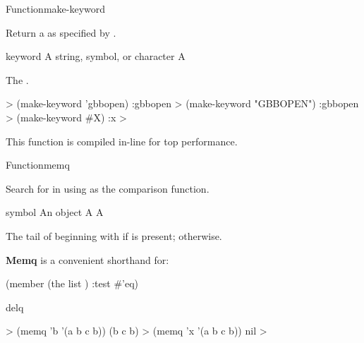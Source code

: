 \documentclass[10pt,twoside,english,pdftex]{article}
\newcommand{\inline}{This function is compiled in-line for top performance.}
\begin{document}

\begin{functiondoc}{Function}{make-keyword}{
    \returns{} } 
%
%
  
\fnsyntax

\fnpurpose Return a  as specified by .

\fnpackage {}

\fnmodule {}

\fnargs
\begin{args}{keyword}
\arg[x] A string, symbol, or character
\arg[keyword] A 
\end{args}

\fnreturns The .

\fnexamples
%
\W\supp
\begin{example}
  > (make-keyword 'gbbopen)
  :gbbopen
  > (make-keyword "GBBOPEN")
  :gbbopen
  > (make-keyword #\bkslash{}X)
  :x
  >
\end{example}

\fnnote \inline

\end{functiondoc}


\begin{functiondoc}{Function}{memq}{
    \returns{} } 
%
  
\fnsyntax

\fnpurpose Search for  in  using  as the
comparison function.

\fnpackage {}

\fnmodule {}

\fnargs
\begin{args}{symbol}
\arg[item] An object
\arg[list] A 
\arg[tail] A 
\end{args}

\fnreturns The tail of  beginning with  if
 is present; \nil{} otherwise.

\fndescription \textbf{Memq} is a convenient shorthand for:
%
\W\supp
\begin{example}
  (member  (the list ) :test #'eq)
\end{example}

\begin{alsos}{delq}
\also[delq]
\end{alsos}

\fnexamples
%
\W\supp
\begin{example}
  > (memq 'b '(a b c b))
  (b c b)
  > (memq 'x '(a b c b))
  nil
  >
\end{example}

\end{functiondoc}
\end{document}
